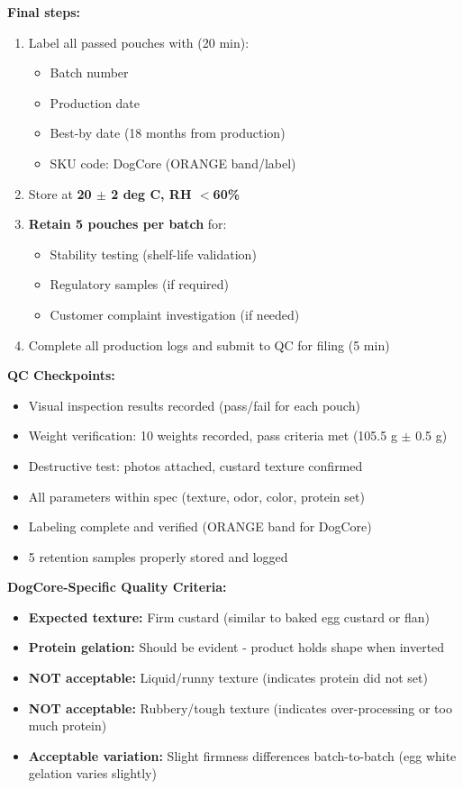 \textbf{Final steps:}
\begin{enumerate}[resume,leftmargin=1.5em]
\item Label all passed pouches with (20 min):
  \begin{itemize}
  \item Batch number
  \item Production date
  \item Best-by date (18 months from production)
  \item SKU code: DogCore (ORANGE band/label)
  \end{itemize}
\item Store at \textbf{20 $\pm$ 2 deg C, RH $<$60\%}
\item \textbf{Retain 5 pouches per batch} for:
  \begin{itemize}
  \item Stability testing (shelf-life validation)
  \item Regulatory samples (if required)
  \item Customer complaint investigation (if needed)
  \end{itemize}
\item Complete all production logs and submit to QC for filing (5 min)
\end{enumerate}

\textbf{QC Checkpoints:}
\begin{itemize}
\item Visual inspection results recorded (pass/fail for each pouch)
\item Weight verification: 10 weights recorded, pass criteria met (105.5 g $\pm$ 0.5 g)
\item Destructive test: photos attached, custard texture confirmed
\item All parameters within spec (texture, odor, color, protein set)
\item Labeling complete and verified (ORANGE band for DogCore)
\item 5 retention samples properly stored and logged
\end{itemize}

\textbf{DogCore-Specific Quality Criteria:}
\begin{itemize}
\item \textbf{Expected texture:} Firm custard (similar to baked egg custard or flan)
\item \textbf{Protein gelation:} Should be evident - product holds shape when inverted
\item \textbf{NOT acceptable:} Liquid/runny texture (indicates protein did not set)
\item \textbf{NOT acceptable:} Rubbery/tough texture (indicates over-processing or too much protein)
\item \textbf{Acceptable variation:} Slight firmness differences batch-to-batch (egg white gelation varies slightly)
\end{itemize}


